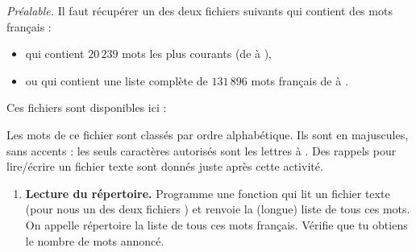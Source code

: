\documentclass[11pt,class=report,crop=false]{standalone}
\begin{document}





\begin{activite}
   
 
\emph{Préalable.} Il faut récupérer un des deux fichiers suivants qui contient des mots français :
\begin{itemize}
  \item {} qui contient $20\,239$ mots les plus courants (de  à ),
  \item ou  qui contient une liste complète de $131\,896$ mots français de  à .
\end{itemize}

\smallskip

Ces fichiers sont disponibles ici :

\medskip

Les mots de ce fichier sont classés par ordre alphabétique.
Ils sont en majuscules, sans accents : les seuls caractères autorisés sont les lettres  à . Des rappels pour lire/écrire un fichier texte sont donnés juste après cette activité.

 
\begin{enumerate}
  \item \textbf{Lecture du répertoire.} Programme une fonction  qui lit un fichier texte (pour nous un des deux fichiers ) et renvoie la (longue) liste de tous ces mots. On appelle \og{}répertoire\fg{} la liste de tous ces mots français.  Vérifie que tu obtiens le nombre de mots annoncé.
  

\end{enumerate}
\end{activite}
\end{document}
